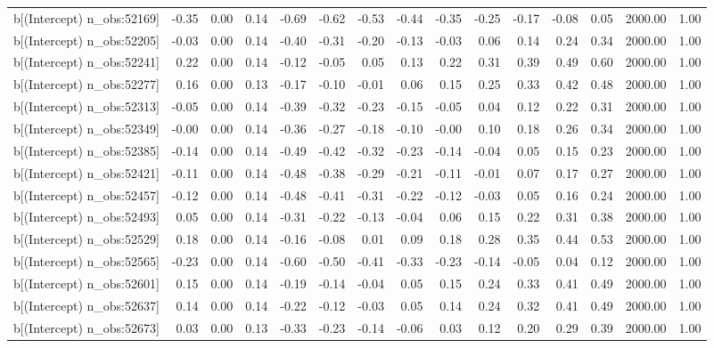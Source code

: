 \begin{table}[ht]
\begin{tabular}{rrrrrrrrrrrrrrr}
  b[(Intercept) n\_obs:52169] & -0.35 & 0.00 & 0.14 & -0.69 & -0.62 & -0.53 & -0.44 & -0.35 & -0.25 & -0.17 & -0.08 & 0.05 & 2000.00 & 1.00 \\ 
  b[(Intercept) n\_obs:52205] & -0.03 & 0.00 & 0.14 & -0.40 & -0.31 & -0.20 & -0.13 & -0.03 & 0.06 & 0.14 & 0.24 & 0.34 & 2000.00 & 1.00 \\ 
  b[(Intercept) n\_obs:52241] & 0.22 & 0.00 & 0.14 & -0.12 & -0.05 & 0.05 & 0.13 & 0.22 & 0.31 & 0.39 & 0.49 & 0.60 & 2000.00 & 1.00 \\ 
  b[(Intercept) n\_obs:52277] & 0.16 & 0.00 & 0.13 & -0.17 & -0.10 & -0.01 & 0.06 & 0.15 & 0.25 & 0.33 & 0.42 & 0.48 & 2000.00 & 1.00 \\ 
  b[(Intercept) n\_obs:52313] & -0.05 & 0.00 & 0.14 & -0.39 & -0.32 & -0.23 & -0.15 & -0.05 & 0.04 & 0.12 & 0.22 & 0.31 & 2000.00 & 1.00 \\ 
  b[(Intercept) n\_obs:52349] & -0.00 & 0.00 & 0.14 & -0.36 & -0.27 & -0.18 & -0.10 & -0.00 & 0.10 & 0.18 & 0.26 & 0.34 & 2000.00 & 1.00 \\ 
  b[(Intercept) n\_obs:52385] & -0.14 & 0.00 & 0.14 & -0.49 & -0.42 & -0.32 & -0.23 & -0.14 & -0.04 & 0.05 & 0.15 & 0.23 & 2000.00 & 1.00 \\ 
  b[(Intercept) n\_obs:52421] & -0.11 & 0.00 & 0.14 & -0.48 & -0.38 & -0.29 & -0.21 & -0.11 & -0.01 & 0.07 & 0.17 & 0.27 & 2000.00 & 1.00 \\ 
  b[(Intercept) n\_obs:52457] & -0.12 & 0.00 & 0.14 & -0.48 & -0.41 & -0.31 & -0.22 & -0.12 & -0.03 & 0.05 & 0.16 & 0.24 & 2000.00 & 1.00 \\ 
  b[(Intercept) n\_obs:52493] & 0.05 & 0.00 & 0.14 & -0.31 & -0.22 & -0.13 & -0.04 & 0.06 & 0.15 & 0.22 & 0.31 & 0.38 & 2000.00 & 1.00 \\ 
  b[(Intercept) n\_obs:52529] & 0.18 & 0.00 & 0.14 & -0.16 & -0.08 & 0.01 & 0.09 & 0.18 & 0.28 & 0.35 & 0.44 & 0.53 & 2000.00 & 1.00 \\ 
  b[(Intercept) n\_obs:52565] & -0.23 & 0.00 & 0.14 & -0.60 & -0.50 & -0.41 & -0.33 & -0.23 & -0.14 & -0.05 & 0.04 & 0.12 & 2000.00 & 1.00 \\ 
  b[(Intercept) n\_obs:52601] & 0.15 & 0.00 & 0.14 & -0.19 & -0.14 & -0.04 & 0.05 & 0.15 & 0.24 & 0.33 & 0.41 & 0.49 & 2000.00 & 1.00 \\ 
  b[(Intercept) n\_obs:52637] & 0.14 & 0.00 & 0.14 & -0.22 & -0.12 & -0.03 & 0.05 & 0.14 & 0.24 & 0.32 & 0.41 & 0.49 & 2000.00 & 1.00 \\ 
  b[(Intercept) n\_obs:52673] & 0.03 & 0.00 & 0.13 & -0.33 & -0.23 & -0.14 & -0.06 & 0.03 & 0.12 & 0.20 & 0.29 & 0.39 & 2000.00 & 1.00 \\ 

\end{tabular}
\end{table}
